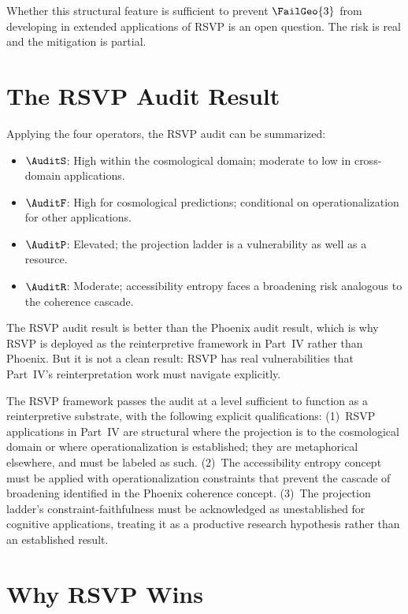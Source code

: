 Whether this structural feature is sufficient to prevent
$\FailGeo{3}$ from developing in extended applications
of RSVP is an open question. The risk is real and the
mitigation is partial.

\section{The RSVP Audit Result}
\label{sec:rsvp-result}

Applying the four operators, the RSVP audit can be
summarized:

\begin{itemize}
  \item $\AuditS$: High within the cosmological domain;
  moderate to low in cross-domain applications.
  \item $\AuditF$: High for cosmological predictions;
  conditional on operationalization for other applications.
  \item $\AuditP$: Elevated; the projection ladder is
  a vulnerability as well as a resource.
  \item $\AuditR$: Moderate; accessibility entropy faces
  a broadening risk analogous to the coherence cascade.
\end{itemize}

The RSVP audit result is better than the Phoenix audit
result, which is why RSVP is deployed as the reinterpretive
framework in Part~IV rather than Phoenix. But it is
not a clean result: RSVP has real vulnerabilities that
Part~IV's reinterpretation work must navigate explicitly.

\begin{auditprop}
\label{ap:rsvp-qualified}
The RSVP framework passes the \Ortyx{} audit at a
level sufficient to function as a reinterpretive
substrate, with the following explicit qualifications:
(1)~RSVP applications in Part~IV are structural
where the projection is to the cosmological domain
or where operationalization is established; they
are metaphorical elsewhere, and must be labeled as
such. (2)~The accessibility entropy concept must
be applied with operationalization constraints that
prevent the cascade of broadening identified in the
Phoenix coherence concept. (3)~The projection
ladder's constraint-faithfulness must be acknowledged
as unestablished for cognitive applications, treating
it as a productive research hypothesis rather than
an established result.
\end{auditprop}

\section{Why RSVP Wins}
\label{sec:why-rsvp-wins}

